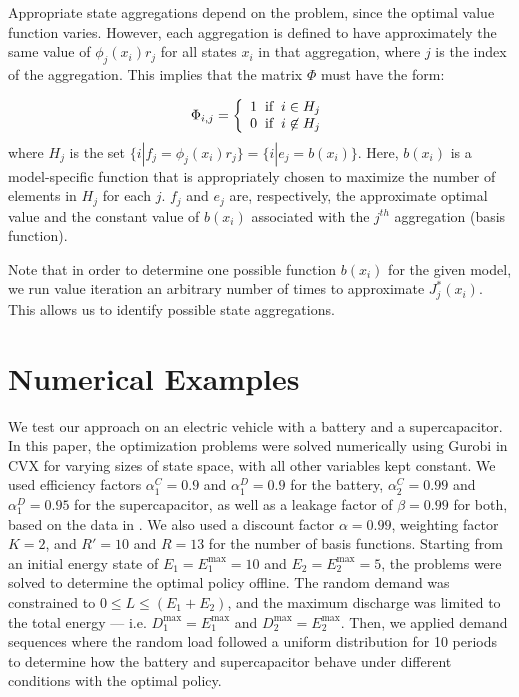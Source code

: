 \documentclass[conference]{IEEEtran}
\begin{document}
    Appropriate state aggregations depend on the problem, since the optimal value function varies. %
    However, each aggregation is defined to have approximately the same value of $\phi_{j}(x_{i})r_{j}$ for all states $x_{i}$ in that aggregation, where $j$ is the index of the aggregation. This implies that the matrix $\Phi$ must have the form:
    
    \begin{displaymath}
        \Phi_{i,j}=\left\{
            \begin{array}{l}
            1 \hspace{0.2cm} \text{if} \hspace{0.2cm} i\in H_{j}\\
            0 \hspace{0.2cm} \text{if} \hspace{0.2cm} i\not\in H_{j}
            \end{array}
            \right.
    \end{displaymath}where $H_{j}$ is the set $\{i|f_{j} = \phi_{j}(x_{i})r_{j}\}=\{i|e_{j} = b(x_{i})\}$. Here, $b(x_{i})$ is a model-specific function that is appropriately chosen to maximize the number of elements in $H_{j}$ for each $j$. $f_{j}$ and $e_{j}$ are, respectively, the approximate optimal value and the constant value of $b(x_{i})$ associated with the $j^{th}$ aggregation (basis function).
	
	Note that in order to determine one possible function $b(x_{i})$ for the given model, we run value iteration an arbitrary number of times to approximate $J^{*}_{j}(x_{i})$. This allows us to identify possible state aggregations.
    

\section{Numerical Examples}
We test our approach on an electric vehicle with a battery and a supercapacitor. In this paper, the optimization problems were solved numerically using Gurobi in CVX for varying sizes of state space, with all other variables kept constant. We used efficiency factors $\alpha^{C}_{1}=0.9$ and $\alpha^{D}_{1}=0.9$ for the battery, $\alpha^{C}_{2}=0.99$ and $\alpha^{D}_{1}=0.95$ for the supercapacitor, as well as a leakage factor of $\beta=0.99$ for both, based on the data in \cite{BattSupercapEff}. We also used a discount factor $\alpha=0.99$, weighting factor $K=2$, and $R'=10$ and $R=13$ for the number of basis functions. Starting from an initial energy state of $E_{1}=E_{1}^{\max}=10$ and $E_{2}=E_{2}^{\max}=5$, the problems were solved to determine the optimal policy offline. The random demand was constrained to $0\leq L \leq (E_{1}+E_{2})$, and the maximum discharge was limited to the total energy --- i.e. $D_{1}^{\max}=E_{1}^{\max}$ and $D_{2}^{\max}=E_{2}^{\max}$. Then, we applied demand sequences where the random load followed a uniform distribution for 10 periods to determine how the battery and supercapacitor behave under different conditions with the optimal policy.
\end{document}
